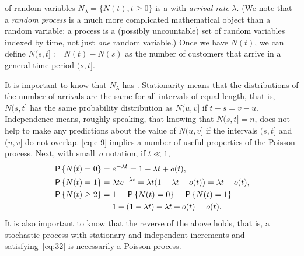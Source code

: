 \documentclass[queueing-book.tex]{subfiles}
\begin{document}
 of random variables $N_\lambda=\{N(t), t\geq 0\}$ is a  with \emph{arrival rate} $\lambda$.
(We note that a \emph{random process} is a much more complicated mathematical object than a random variable: a process is a (possibly uncountable) set of random variables indexed by time, not just \emph{one} random variable.)
Once we have $N(t)$, we can define $N(s, t] := N(t)-N(s)$ as the number of customers that arrive in a general time period $(s, t]$.\sidenote{Note that $[0,t]$ is closed at both ends, but $(s,t]$ is open at the left.}

It is important to know that $N_\lambda$ has .
Stationarity means that the distributions of the number of arrivals are the same for all intervals of equal length, that is, $N(s,t]$ has the same probability distribution as $N(u, v]$ if $t-s = v-u$.
Independence means, roughly speaking, that knowing that $N(s,t]= n$, does not help to make any predictions about the value of $N(u, v]$ if the intervals $(s,t]$ and $(u, v]$ do not overlap.
\cref{eq:e-9} implies a number of useful properties of the Poisson process.
Next, with small~$o$ notation, if $t\ll 1$,
\begin{subequations}\label{eq:32}
\begin{align}
\P{N( t) = 0} &= e^{-\lambda t} = 1-\lambda  t + o( t), \\
\P{N( t) = 1} &= \lambda t e^{-\lambda t} = \lambda t (1-\lambda t + o(t)) = \lambda  t + o( t), \label{eq:8} \\
\P{N( t)  \geq 2} &= 1 - \P{N(t) = 0} - \P{N(t)= 1} \\
  &= 1 - (1-\lambda t) - \lambda t + o(t) = o(t). \label{eq:10}
\end{align}
\end{subequations}
It is also important to know that the reverse of the above holds, that is, a stochastic process with stationary and independent increments and satisfying~\cref{eq:32} is necessarily a Poisson process.
\end{document}

